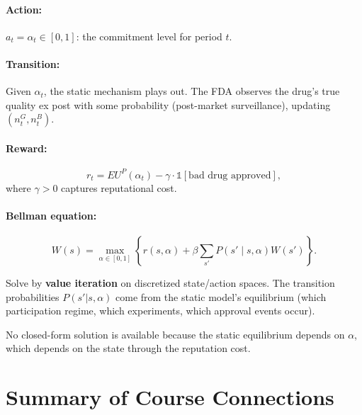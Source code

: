 \documentclass[12pt,a4paper]{article}
\begin{document}
\paragraph{Action:}
$a_t = \alpha_t \in [0, 1]$: the commitment level for
period $t$.

\paragraph{Transition:}
Given $\alpha_t$, the static mechanism plays out.
The FDA observes the drug's true quality ex post with
some probability (post-market surveillance), updating
$(n_t^G, n_t^B)$.

\paragraph{Reward:}
\[
  r_t = EU^P(\alpha_t)
  - \gamma \cdot \mathbb{1}[\text{bad drug approved}],
\]
where $\gamma > 0$ captures reputational cost.

\paragraph{Bellman equation:}
\begin{equation}\label{eq:bellman}
  W(s) = \max_{\alpha \in [0,1]}
  \left\{
    r(s, \alpha)
    + \beta \sum_{s'} P(s' \mid s, \alpha) W(s')
  \right\}.
\end{equation}

Solve by \textbf{value iteration} on discretized
state/action spaces. The transition probabilities
$P(s'|s,\alpha)$ come from the static model's equilibrium
(which participation regime, which experiments, which
approval events occur).

No closed-form solution is available because the
static equilibrium depends on $\alpha$, which depends on
the state through the reputation cost.


\section{Summary of Course Connections}
\label{sec:summary}
\end{document}
